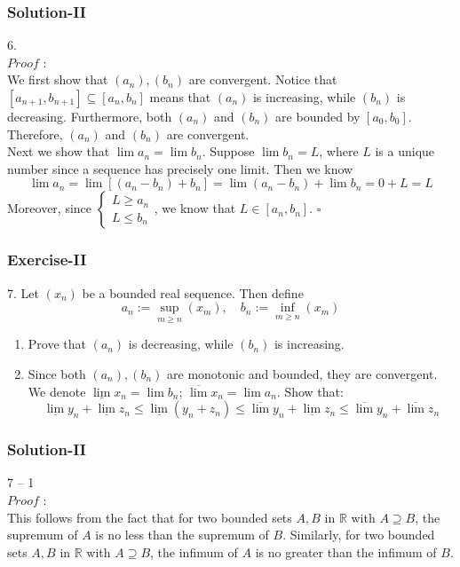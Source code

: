 \documentclass[12pt, t]{beamer}
\newcommand{\myqed}{\hfill$\square$}
\begin{document}
\begin{frame}
    \frametitle{Solution-II}
    6.\\
    $Proof$ : \\
    \hspace{1em} We first show that $(a_n),(b_n)$ are convergent. Notice that $[a_{n+1}, b_{n+1}]\subseteq [a_n,b_n]$
    means that $(a_n)$ is increasing, while $(b_n)$ is decreasing. Furthermore, both $(a_n)$ and $(b_n)$ are bounded by
    $[a_0,b_0]$. Therefore, $(a_n)$ and $(b_n)$ are convergent.\\
    \hspace{1em} Next we show that $\lim a_n=\lim b_n$. Suppose $\lim b_n=L$, where $L$ is a unique number since a sequence
    has precisely one limit. Then we know
    \begin{equation*}
        \lim a_n=\lim [(a_n-b_n)+b_n]=\lim (a_n-b_n) + \lim b_n= 0+L=L
    \end{equation*}
    Moreover, since
    $\begin{cases}
            L \geq a_n \\
            L \leq b_n
        \end{cases}$, we know that $L\in [a_n,b_n]$.
    \myqed
\end{frame}

\begin{frame}
    \frametitle{Exercise-II}
    7. Let $(x_n)$ be a bounded real sequence. Then define
    \begin{equation*}
        a_n:=\sup_{m\geq n}(x_m),\quad b_n:=\inf_{m\geq n}(x_m)
    \end{equation*}

    \begin{enumerate}
        \item Prove that $(a_n)$ is decreasing, while $(b_n)$ is increasing.
        \item Since both $(a_n),(b_n)$ are monotonic and bounded, they are convergent.
              We denote $\underline{\lim} x_n=\lim b_n$; $\overline{\lim}x_n=\lim a_n$. Show that:
              \begin{equation*}
                  \underline{\lim}y_n+\underline{\lim}z_n\leq \underline{\lim} (y_n+z_n)\leq\overline{\lim}y_n+\underline{\lim}z_n\leq\overline{\lim}y_n+\overline{\lim}z_n
              \end{equation*}
    \end{enumerate}
\end{frame}

\begin{frame}
    \frametitle{Solution-II}
    7 -- 1\\
    $Proof$ : \\
    \hspace{1em} This follows from the fact that for two bounded sets $A,B$ in $\mathbb{R}$ with $A\supseteq B$, the supremum of $A$ is no less than
    the supremum of $B$.  Similarly, for two bounded sets $A,B$ in $\mathbb{R}$ with $A\supseteq B$, the infimum of $A$ is no greater than the infimum of $B$.


\end{frame}
\end{document}
